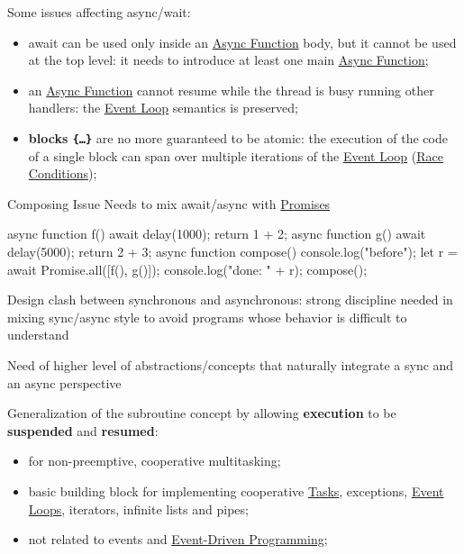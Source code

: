 \begin{critical}[Issues]
    Some issues affecting async/wait:
    \begin{itemize}
        \item await can be used only inside an \hyperref[sub:rs_async_functions]{Async Function} body, but it cannot be used at the top level: it needs to introduce at least one main \hyperref[sub:rs_async_functions]{Async Function};
        \item an \hyperref[sub:rs_async_functions]{Async Function} cannot resume while the thread is busy running other handlers: the \hyperref[sec:rs_event_loop]{Event Loop} semantics is preserved;
        \item \textbf{blocks \texttt{\{\dots\}}} are no more guaranteed to be atomic: the execution of the code of a single block can span over multiple iterations of the  \hyperref[sec:rs_event_loop]{Event Loop} (\hyperref[def:race-cond]{Race Conditions});
    \end{itemize}
    \begin{example}{Composing Issue}{}
        Needs to mix await/async with \hyperref[def:promises]{Promises}
        \begin{codeblock}[js]{}
        async function f(){
            await delay(1000);
            return 1 + 2;
        }
        async function g(){
            await delay(5000);
            return 2 + 3;
        }
        async function compose(){
            console.log("before");
            let r = await Promise.all([f(), g()]);
            console.log("done: " + r);
        }
        compose();
        \end{codeblock}
    \end{example}
    \begin{note}
        Design clash between synchronous and asynchronous: strong discipline needed in mixing sync/async style to avoid programs whose behavior is difficult to understand
        \begin{tip}
            Need of higher level of abstractions/concepts that naturally integrate a sync and an async perspective
        \end{tip}
    \end{note}
\end{critical}
Generalization of the subroutine concept by allowing \textbf{execution} to be \textbf{suspended} and \textbf{resumed}:
\begin{itemize}
    \item for non-preemptive, cooperative multitasking;
    \item basic building block for implementing cooperative \hyperref[def:task]{Tasks}, exceptions, \hyperref[sec:rs_event_loop]{Event Loops}, iterators, infinite lists and pipes;
    \item not related to events and \hyperref[sec:rs_event_driven_programming]{Event-Driven Programming};
\end{itemize}
%
